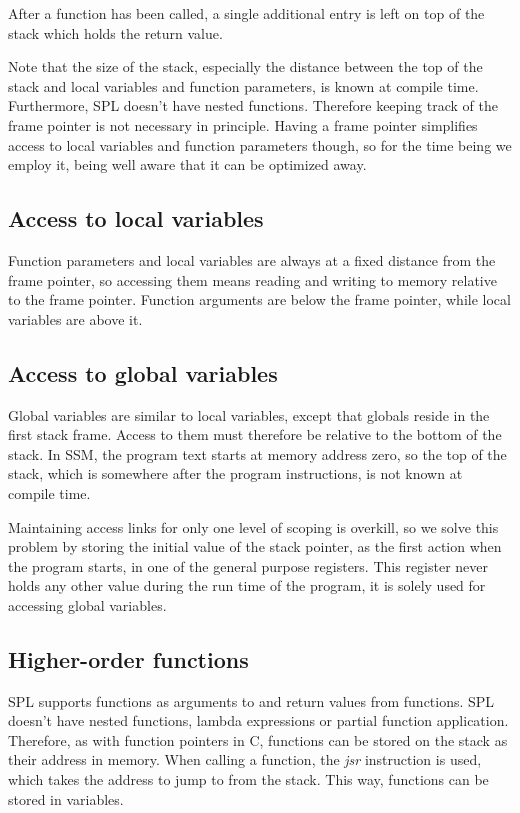 \documentclass[a4paper]{article}
\begin{document}
After a function has been called, a single additional entry is left on top of
the stack which holds the return value.

Note that the size of the stack, especially the distance between the top of the
stack and local variables and function parameters, is known at compile time.
Furthermore, SPL doesn't have nested functions.  Therefore keeping track of the
frame pointer is not necessary in principle.  Having a frame pointer simplifies
access to local variables and function parameters though, so for the time being
we employ it, being well aware that it can be optimized away.


\subsection{Access to local variables}

Function parameters and local variables are always at a fixed distance from the
frame pointer, so accessing them means reading and writing to memory relative to
the frame pointer.  Function arguments are below the frame pointer, while local
variables are above it.

\subsection{Access to global variables}

Global variables are similar to local variables, except that globals reside in
the first stack frame.  Access to them must therefore be relative to the bottom
of the stack.  In SSM, the program text starts at memory address zero, so the
top of the stack, which is somewhere after the program instructions, is not
known at compile time.

Maintaining access links for only one level of scoping is overkill, so we
solve this problem by storing the initial value of the stack pointer, as the
first action when the program starts, in one of the general purpose registers.
This register never holds any other value during the run time of the program, it
is solely used for accessing global variables.

\subsection{Higher-order functions}

SPL supports functions as arguments to and return values from functions.  SPL
doesn't have nested functions, lambda expressions or partial function
application.  Therefore, as with function pointers in C, functions can be stored
on the stack as their address in memory.  When calling a function, the
\emph{jsr} instruction is used, which takes the address to jump to from the
stack.  This way, functions can be stored in variables.
\end{document}
